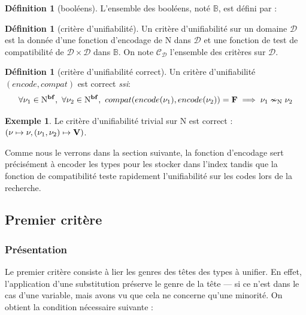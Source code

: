 \documentclass[a4paper]{report}
\theoremstyle{definition}
\newtheorem{definition}[theoreme]{Définition}
\newtheorem{exemple}[theoreme]{Exemple}
\newcommand{\ssi}{\textit{ssi}\xspace}
\newcommand{\N}{\mathrm{N}}
\begin{document}
\begin{definition}[booléens]
  L'ensemble des booléens, noté $\mathbb{B}$, est défini par :
\end{definition}

\begin{definition}[critère d'unifiabilité]
  Un critère d'unifiabilité sur un domaine $\mathscr{D}$ est la donnée d'une fonction d'encodage de $\N$ dans $\mathscr{D}$ et une fonction de test de compatibilité de $\mathscr{D} \times \mathscr{D}$ dans $\mathbb{B}$. On note $\mathscr{C}_\mathscr{D}$ l'ensemble des critères sur $\mathscr{D}$.
\end{definition}

\begin{definition}[critère d'unifiabilité correct]
  Un critère d'unifiabilité $(encode, compat)$ est correct \ssi :
  \[ \forall \nu_1 \in \N^{\bold{bf}},\ \forall \nu_2 \in \N^{\bold{bf}},\ compat (encode (\nu_1), encode (\nu_2)) = \bold{F} \implies \nu_1 \nsim_\N \nu_2 \]
\end{definition}

\begin{exemple}
  Le critère d'unifiabilité trivial sur $\N$ est correct : $(\nu \mapsto \nu, (\nu_1, \nu_2) \mapsto \bold{V})$.
\end{exemple}

Comme nous le verrons dans la section suivante, la fonction d'encodage sert précisément à encoder les types pour les stocker dans l'index tandis que la fonction de compatibilité teste rapidement l'unifiabilité sur les codes lors de la recherche.


\subsection{Premier critère}

\subsubsection{Présentation}

Le premier critère consiste à lier les genres des têtes des types à unifier. En effet, l'application d'une substitution préserve le genre de la tête — si ce n'est dans le cas d'une variable, mais avons vu que cela ne concerne qu'une minorité. On obtient la condition nécessaire suivante :
\end{document}
